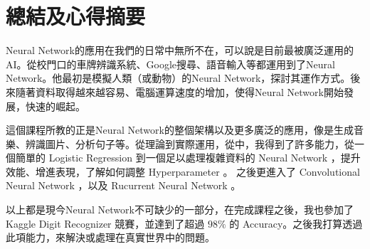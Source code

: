 \chapter*{總結及心得摘要}  

Neural Network的應用在我們的日常中無所不在，可以說是目前最被廣泛運用的AI。從校門口的車牌辨識系統、Google搜尋、語音輸入等都運用到了Neural Network。他最初是模擬人類（或動物）的Neural Network，探討其運作方式。後來隨著資料取得越來越容易、電腦運算速度的增加，使得Neural Network開始發展，快速的崛起。

這個課程所教的正是Neural Network的整個架構以及更多廣泛的應用，像是生成音樂、辨識圖片、分析句子等。從理論到實際運用，從中，我得到了許多能力，從一個簡單的 Logistic Regression 到一個足以處理複雜資料的 Neural Network ，提升效能、增進表現，了解如何調整 Hyperparameter 。 之後更進入了 Convolutional Neural Network ，以及 Rucurrent Neural Network 。

以上都是現今Neural Network不可缺少的一部分，在完成課程之後，我也參加了 Kaggle Digit Recognizer 競賽，並達到了超過 $ 98\% $ 的 Accuracy。之後我打算透過此項能力，來解決或處理在真實世界中的問題。